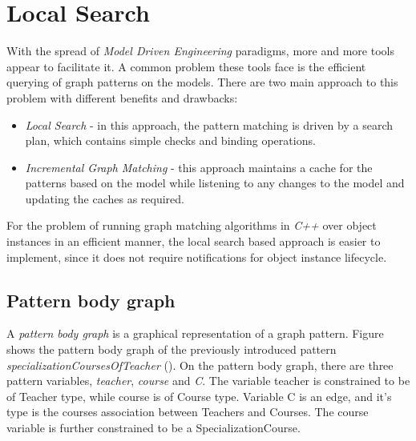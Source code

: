 \chapter{Local Search}


With the spread of \emph{Model Driven Engineering} paradigms, more and more
tools appear to facilitate it. A common problem these tools face is the
efficient querying of graph patterns on the models. There are two main approach
to this problem with different benefits and drawbacks:

\begin{itemize}
  \item \emph{Local Search} - in this approach, the pattern matching is driven
  by a search plan, which contains simple checks and binding operations.
  \item \emph{Incremental Graph Matching} - this approach maintains a cache
  for the patterns based on the model while listening to any changes to the
  model and updating the caches as required.
\end{itemize}

For the problem of running graph matching algorithms in \emph{C++} over object
instances in an efficient manner, the local search based approach is easier to
implement, since it does not require notifications for object instance
lifecycle.

\section{Pattern body graph}\label{sec:PatternBodyGraph}

A \emph{pattern body graph} is a graphical representation of a graph pattern.
Figure  shows the pattern body graph of the previously
introduced pattern \emph{specializationCoursesOfTeacher}
(). On the pattern body graph, there are three
pattern variables, \emph{teacher}, \emph{course} and \emph{C}. The variable
teacher is constrained to be of Teacher type, while course is of Course type.
Variable C is an edge, and it's type is the courses association between Teachers
and Courses. The course variable is further constrained to be a
SpecializationCourse.

